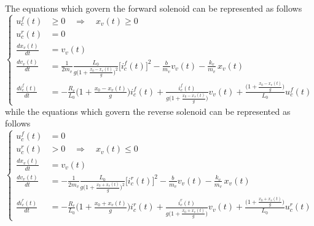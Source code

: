 \documentclass[12pt,a4paper,oneside]{book}
\begin{document}
\begin{onehalfspace}
The equations which govern the forward solenoid can be represented as follows 
\begin{equation}\label{solenoid_mech_eq_5}
	\left\lbrace \begin{aligned}
		u_c^f(t)&\ge0 \quad \Rightarrow \quad x_v(t)\ge 0 \\[6pt]
		u_c^r(t)&=0\\[6pt]
		\frac{dx_v(t)}{dt} &= v_v(t) \\[6pt]
		\frac{dv_v(t)}{dt} &= \frac{1}{2m_v}\frac{L_0}{g\Big(1+\frac{x_0 - x_v(t)}{g}\Big)^2}\Big[i_c^f(t)\Big]^2-\frac{b}{m_v} v_v(t) - \frac{k_v}{m_v}\,x_v(t)\\[6pt]
		\frac{di_c^f(t)}{dt} &=-\frac{R_c}{L_0}\Big(1+\frac{x_0 - x_v(t)}{g}\Big)i_c^f(t)+\frac{i_c^f(t)}{g\Big(1+\frac{x_0 - x_v(t)}{g}\Big)}v_v(t) +\frac{\Big(1+\frac{x_0 - x_v(t)}{g}\Big)}{L_0}u_c^f(t)
	\end{aligned}\right. 
\end{equation}
while the equations which govern the reverse solenoid can be represented as follows 
\begin{equation}\label{solenoid_mech_eq_6}
	\left\lbrace \begin{aligned}
		u_c^f(t)&=0 \\[6pt]
		u_c^r(t)&>0 \quad \Rightarrow \quad x_v(t)\le 0 \\[6pt]
		\frac{dx_v(t)}{dt} &= v_v(t) \\[6pt]
		\frac{dv_v(t)}{dt} &= -\frac{1}{2m_v}\frac{L_0}{g\Big(1+\frac{x_0 + x_v(t)}{g}\Big)^2}\Big[i_c^r(t)\Big]^2-\frac{b}{m_v} v_v(t) - \frac{k_v}{m_v}\,x_v(t)\\[6pt]
		\frac{di_c^r(t)}{dt} &=-\frac{R_c}{L_0}\Big(1+\frac{x_0 + x_v(t)}{g}\Big)i_c^r(t)+\frac{i_c^r(t)}{g\Big(1+\frac{x_0 + x_v(t)}{g}\Big)}v_v(t) +\frac{\Big(1+\frac{x_0 + x_v(t)}{g}\Big)}{L_0}u_c^r(t)
	\end{aligned}\right. 
\end{equation}

\end{onehalfspace}
\end{document}

